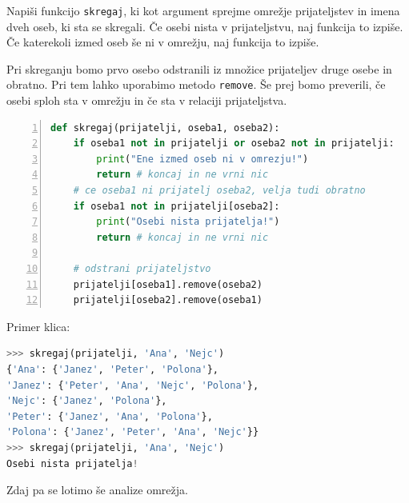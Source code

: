 \begin{zgled}
Napiši funkcijo \texttt{skregaj}, ki kot argument sprejme omrežje prijateljstev in imena dveh oseb, ki sta se skregali. Če osebi nista v prijateljstvu, naj funkcija to izpiše. Če katerekoli izmed oseb še ni v omrežju, naj funkcija to izpiše. 
\end{zgled}
\begin{resitev}
Pri skreganju bomo prvo osebo odstranili iz množice prijateljev druge osebe in obratno. Pri tem lahko uporabimo metodo \texttt{remove}. Še prej bomo preverili, če osebi sploh sta v omrežju in če sta v relaciji prijateljstva.
\begin{lstlisting}[language=Python,numbers=left]
def skregaj(prijatelji, oseba1, oseba2):
    if oseba1 not in prijatelji or oseba2 not in prijatelji:
        print("Ene izmed oseb ni v omrezju!")
        return # koncaj in ne vrni nic
    # ce oseba1 ni prijatelj oseba2, velja tudi obratno
    if oseba1 not in prijatelji[oseba2]:    
        print("Osebi nista prijatelja!")
        return # koncaj in ne vrni nic
    
    # odstrani prijateljstvo
    prijatelji[oseba1].remove(oseba2)
    prijatelji[oseba2].remove(oseba1)
\end{lstlisting}
Primer klica:
\begin{lstlisting}[language=Python]
>>> skregaj(prijatelji, 'Ana', 'Nejc')
{'Ana': {'Janez', 'Peter', 'Polona'}, 
'Janez': {'Peter', 'Ana', 'Nejc', 'Polona'}, 
'Nejc': {'Janez', 'Polona'}, 
'Peter': {'Janez', 'Ana', 'Polona'}, 
'Polona': {'Janez', 'Peter', 'Ana', 'Nejc'}}
>>> skregaj(prijatelji, 'Ana', 'Nejc')
Osebi nista prijatelja!
\end{lstlisting}
\end{resitev}

Zdaj pa se lotimo še analize omrežja.

